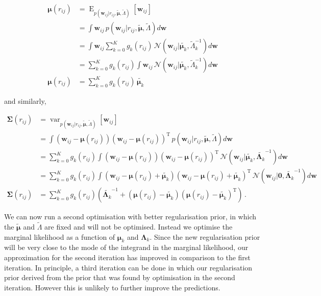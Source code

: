 \documentclass[12pt,a4paper,twoside]{book}
\newcommand{\Gauss}{\mathcal{N}}
\newcommand{\Lk}{\mathbf{\Lambda}_k}
\newcommand{\muk}{\mathbf{\mu}_k}
\newcommand{\rij}{r_{ij}}
\newcommand{\w}{\mathbf{w}}
\newcommand{\wij}{\mathbf{w}_{ij}}
\theoremstyle{definition}
\theoremstyle{definition}
\theoremstyle{remark}
\begin{document}
\begin{align} 
    \mathbf{\mu}(r_{ij}) &= \operatorname{E}_{p( \wij | \rij, \tilde{\mathbf{\mu}}, \tilde{\Lambda})} \left[  \wij \right]  \\
    &= \int \wij \, p( \wij | \rij, \tilde{\mathbf{\mu}}, \tilde{\Lambda}) d \w  \\
    &= \int \wij \sum_{k=0}^K g_k(\rij) \, \Gauss(\wij | \tilde{\muk}, \tilde{\Lambda}_k^{-1})  d \w \\
    &= \sum_{k=0}^K g_k(\rij) \int \wij  \, \Gauss(\wij | \tilde{\muk}, \tilde{\Lambda}_k^{-1})  d \w  \\
    \mathbf{\mu}(r_{ij}) &= \sum_{k=0}^K g_k(\rij) \, \tilde{\muk}
\end{align}

and similarly,

\begin{align}
    \mathbf{\Sigma}(r_{ij}) &= \operatorname{var}_{ p(\wij | \rij, \tilde{\mathbf{\mu}}, \tilde{\Lambda} )}  \left[ \wij \right] \\
    &= \int (\wij - \mathbf{\mu}(r_{ij})) (\wij - \mathbf{\mu}(r_{ij}))^\mathrm{T} \, p( \wij | \rij, \tilde{\mathbf{\mu}}, \tilde{\Lambda}) d \w \\
    &= \sum_{k=0}^K g_k(\rij) \int  (\wij - \mathbf{\mu}(r_{ij})) (\wij - \mathbf{\mu}(r_{ij}))^\mathrm{T} \, \Gauss(\wij | \tilde{\muk}, \tilde{\Lk}^{-1}) d \w \\
    &= \sum_{k=0}^K g_k(\rij) \int  (\wij - \mathbf{\mu}(r_{ij}) + \tilde{\muk}) (\wij - \mathbf{\mu}(r_{ij}) + \tilde{\muk})^\mathrm{T} \, \Gauss(\wij | \mathbf{0} , \tilde{\Lk}^{-1}) d \w \\
    \mathbf{\Sigma}(r_{ij}) &= \sum_{k=0}^K g_k(\rij) \left( \tilde{\Lk}^{-1} + (\mathbf{\mu}(r_{ij}) - \tilde{\muk}) (\mathbf{\mu}(r_{ij}) - \tilde{\muk})^\mathrm{T}\right) \,. 
\end{align}

We can now run a second optimisation with better regularisation prior,
in which the \(\tilde{\mathbf{\mu}}\) and \(\tilde{\Lambda}\) are fixed
and will not be optimised. Instead we optimise the marginal likelihood
as a function of \(\muk\) and \(\Lk\). Since the new regularisation
prior will be very close to the mode of the integrand in the marginal
likelihood, our approximation for the second iteration has improved in
comparison to the first iteration. In principle, a third iteration can
be done in which our regularisation prior derived from the prior that
was found by optimisation in the second iteration. However this is
unlikely to further improve the predictions.
\end{document}
